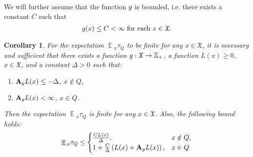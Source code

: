 \documentclass[10pt, reqno]{amsart}
\newtheorem{repeated_corollary}{Corollary}
\theoremstyle{definition}
\newcommand{\aasVar}{Q} %
\newcommand{\astVar}{\tau} %
\newcommand{\atoVar}{\mathbf{A}} %
\newcommand{\ltfVar}{L} %
\newcommand{\assVar}{\mathfrak{X}} %
\newcommand{\integers}{\mathbb{Z}} %
\DeclareMathOperator*{\E}{\mathbb{E}}
\begin{document}
	We will further assume that the function $g$ is bounded, i.e. there exists a constant $C$ such that
	\begin{gather}
	\gffVar(x) \leq C < \infty \text{ for each } x \in \assVar.
	\label{g_assumption}
	\end{gather}
	
	\begin{repeated_corollary}
		For the expectation $\E{}_{x}\astVar_{\aasVar}$ to be finite for any $x \in \assVar$, it is necessary and sufficient that there exists a function $\gffVar:\assVar \xrightarrow{} \integers_{+}$, a function $\ltfVar(x) \geq 0$, $x \in \assVar$, and a constant $\Delta > 0$ such that:
		\begin{enumerate}
			\item[(a)] $\atoVar_{\gffVar}\ltfVar(x) \leq -\Delta$, $x \notin \aasVar$,
			\item[(b)] $\atoVar_{\gffVar}\ltfVar(x) < \infty$, $x \in \aasVar$.
		\end{enumerate}
		Then the expectation $\E{}_{x}\astVar_{\aasVar}$ is finite for any $x \in \assVar$. Also, the following bound holds:
		\begin{align}
		\E{}_{x}\astVar_{\aasVar} \leq \begin{cases}
		\frac{C\ltfVar(x)}{\Delta}, & x \notin \aasVar, \\
		1 + \frac{C}{\Delta}\left(\ltfVar(x) + \atoVar_{\gffVar}\ltfVar(x)\right), & x \in \aasVar
		\end{cases}
		\label{corollary_1_bound}
		\end{align}
	\end{repeated_corollary}
\end{document}
